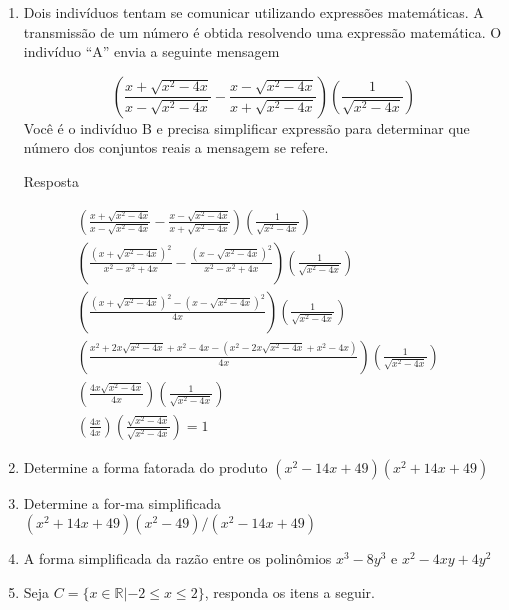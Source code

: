 \documentclass[12pt,onepage,a4paper]{memoir}
\begin{document}
\begin{enumerate}
      

          \item  Dois indivíduos tentam se comunicar utilizando expressões matemáticas. A transmissão de um número é obtida resolvendo uma expressão matemática. O indivíduo “A” envia a seguinte mensagem 

\begin{equation}
  \left( \frac{x + \sqrt{x^2-4x}}{x - \sqrt{x^2-4x}}  - \frac{x - \sqrt{x^2-4x}}{x + \sqrt{x^2-4x}} \right)\left( \frac{1}{\sqrt{x^2-4x}}\right)
\end{equation}
Você é o indivíduo B e precisa simplificar expressão para determinar que número
dos conjuntos reais a mensagem se refere.

Resposta

\begin{align}
  \left( \frac{x + \sqrt{x^2-4x}}{x - \sqrt{x^2-4x}}  - \frac{x - \sqrt{x^2-4x}}{x + \sqrt{x^2-4x}} \right)\left( \frac{1}{\sqrt{x^2-4x}}\right)& \nonumber \\
  \left( \frac{\left(x + \sqrt{x^2-4x}\right)^2}{x^2 - x^2+4x}  - \frac{\left(x - \sqrt{x^2-4x}\right)^2}{x^2  - x^2+4x}\right)\left( \frac{1}{\sqrt{x^2-4x}}\right)& \nonumber \\
  \left( \frac{\left(x + \sqrt{x^2-4x}\right)^2 - \left(x - \sqrt{x^2-4x}\right)^2}{4x}\right)\left( \frac{1}{\sqrt{x^2-4x}}\right)& \nonumber \\
  \left( \frac{x^2  + 2x\sqrt{x^2-4x} + x^2-4x - \left(x^2 - 2x\sqrt{x^2-4x} + x^2-4x\right)}{4x}\right)\left( \frac{1}{\sqrt{x^2-4x}}\right)& \nonumber \\
  \left( \frac{4x\sqrt{x^2-4x}}{4x}\right) \left( \frac{1}{\sqrt{x^2-4x}}\right) & \nonumber \\
   \left( \frac{4x}{4x}\right) \left( \frac{\sqrt{x^2-4x}}{\sqrt{x^2-4x}}\right)  = 1
\end{align}



\item Determine a forma fatorada do produto $(x^2 - 14x + 49 )(x^2 + 14x + 49 )$
\item Determine a for-ma simplificada $(x^2 + 14x + 49)( x^2 - 49)/(x^2 - 14x +
  49)$
  \item  A forma simplificada da razão entre os polinômios $x^3 - 8y^3$ e $x^2 -
    4xy + 4y^2$

  \item Seja $C=\{ x \in \mathbb{R} | -2 \leq x \leq 2  \}$, responda os itens a seguir.  


\end{enumerate}
\end{document}
